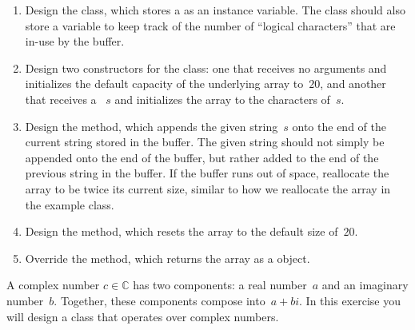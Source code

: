 \begin{enumerate}[label=(\alph*)]
    \item Design the  class, which stores a  as an instance variable. The class should also store a variable to keep track of the number of ``logical characters'' that are in-use by the buffer.
    \item Design two constructors for the  class: one that receives no arguments and initializes the default capacity of the underlying  array to~$20$, and another that receives a ~$s$ and initializes the  array to the characters of~$s$. 
    \item Design the  method, which appends the given string~$s$ onto the end of the current string stored in the buffer. The given string should not simply be appended onto the end of the buffer, but rather added to the end of the previous string in the buffer. If the buffer runs out of space, reallocate the array to be twice its current size, similar to how we reallocate the array in the  example class.
    \item Design the  method, which resets the  array to the default size of~$20$.
    \item Override the  method, which returns the  array as a  object.
\end{enumerate}

A complex number $c \in \mathbb{C}$ has two components: a real number~$a$ and an imaginary number~$b$. 
Together, these components compose into~$a + bi$. 
In this exercise you will design a class that operates over complex numbers.

